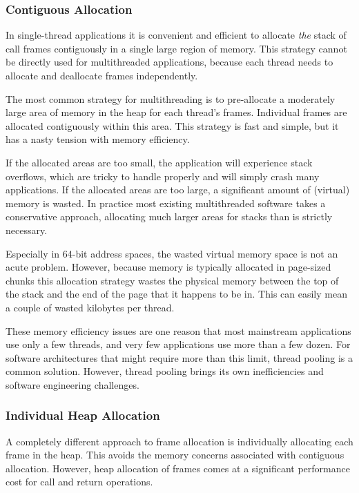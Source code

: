 \documentclass[10pt,preprint]{sigplanconf}
\begin{document}
\subsubsection{Contiguous Allocation}

In single-thread applications it is convenient and efficient to allocate \emph{the} stack of call frames contiguously in a single large region of memory.
This strategy cannot be directly used for multithreaded applications, because each thread needs to allocate and deallocate frames independently.

The most common strategy for multithreading is to pre-allocate a moderately large area of memory in the heap for each thread's frames.
Individual frames are allocated contiguously within this area.
This strategy is fast and simple, but it has a nasty tension with memory efficiency.

If the allocated areas are too small, the application will experience stack overflows, which are tricky to handle properly and will simply crash many applications.
If the allocated areas are too large, a significant amount of (virtual) memory is wasted.
In practice most existing multithreaded software takes a conservative approach, allocating much larger areas for stacks than is strictly necessary.

Especially in 64-bit address spaces, the wasted virtual memory space is not an acute problem.
However, because memory is typically allocated in page-sized chunks this allocation strategy wastes the physical memory between the top of the stack and the end of the page that it happens to be in.
This can easily mean a couple of wasted kilobytes per thread.

These memory efficiency issues are one reason that most mainstream applications use only a few threads, and very few applications use more than a few dozen.
For software architectures that might require more than this limit, thread pooling is a common solution.
However, thread pooling brings its own inefficiencies and software engineering challenges.

\subsubsection{Individual Heap Allocation}

A completely different approach to frame allocation is individually allocating each frame in the heap.
This avoids the memory concerns associated with contiguous allocation.
However, heap allocation of frames comes at a significant performance cost for call and return operations.
\end{document}
